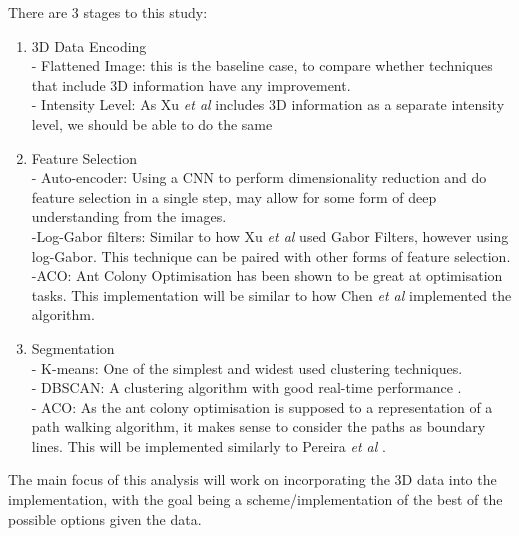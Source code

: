 \documentclass[11pt, a4paper]{article}
\begin{document}
There are 3 stages to this study:
\begin{enumerate}
\item 3D Data Encoding\\
	- Flattened Image: this is the baseline case, to compare whether techniques that include 3D information have any improvement.\\
	- Intensity Level: As Xu \textit{et al} \cite{xu2009automatic} includes 3D information as a separate intensity level, we should be able to do the same
\item Feature Selection\\
	- Auto-encoder: Using a CNN to perform dimensionality reduction and do feature selection in a single step, may allow for some form of deep understanding from the images.\\
	-Log-Gabor filters: Similar to how Xu \textit{et al} \cite{xu2009automatic} used Gabor Filters, however using log-Gabor. This technique can be paired with other forms of feature selection.\\
	-ACO: Ant Colony Optimisation has been shown to be great at optimisation tasks. This implementation will be similar to how Chen \textit{et al} \cite{chen2013efficient} implemented the algorithm.
\item Segmentation\\
	- K-means: One of the simplest and widest used clustering techniques.\\
	- DBSCAN: A clustering algorithm with good real-time performance \cite{shen2016real}.\\
	- ACO: As the ant colony optimisation is supposed to a representation of a path walking algorithm, it makes sense to consider the paths as boundary lines. This will be implemented similarly to Pereira \textit{et al} \cite{pereira2015exudate}.
\end{enumerate}

The main focus of this analysis will work on incorporating the 3D data into the implementation, with the goal being a scheme/implementation of the best of the possible options given the data.
\end{document}
